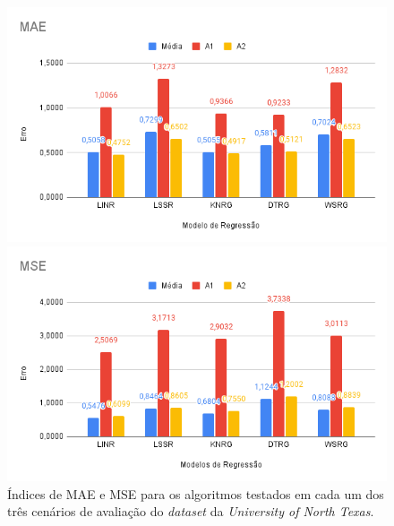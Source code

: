 \begin{figure}[!h]
\begin{minipage}[t]{.5\textwidth}
 \centering
 \includegraphics[width=\textwidth]{figuras/UNT-MAE.png}
\end{minipage}
\hfill
\begin{minipage}[t]{.5\textwidth}
 \centering
 \includegraphics[width=\textwidth]{figuras/UNT-MSE.png}
\end{minipage}
\caption{Índices de MAE e MSE para os algoritmos testados em cada um dos três cenários de avaliação do \textit{dataset} da \textit{University of North Texas}.}
\label{fig-UNT-Err}
\end{figure}

